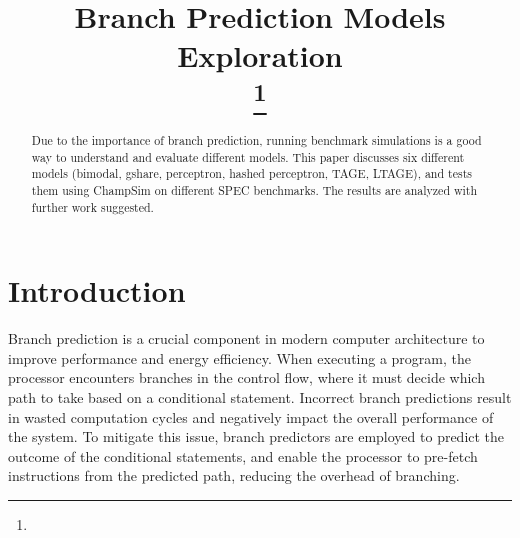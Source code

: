 \documentclass[conference]{IEEEtran}
\begin{document}
\title{Branch Prediction Models Exploration\\
\thanks{}
}
\author{
\and
{}
\and
{}
\and
{}
\and
{}
}

\maketitle

\begin{abstract}
    Due to the importance of branch prediction, running benchmark simulations is a good way to understand and evaluate different models. This paper discusses six different models (bimodal, gshare, perceptron, hashed perceptron, TAGE, LTAGE), and tests them using ChampSim on different SPEC benchmarks. The results are analyzed with further work suggested.
\end{abstract}

\section{Introduction} \label{sec:introduction}
Branch prediction is a crucial component in modern computer architecture to improve performance and energy efficiency. When executing a program, the processor encounters branches in the control flow, where it must decide which path to take based on a conditional statement. Incorrect branch predictions result in wasted computation cycles and negatively impact the overall performance of the system. To mitigate this issue, branch predictors are employed to predict the outcome of the conditional statements, and enable the processor to pre-fetch instructions from the predicted path, reducing the overhead of branching.
\end{document}
